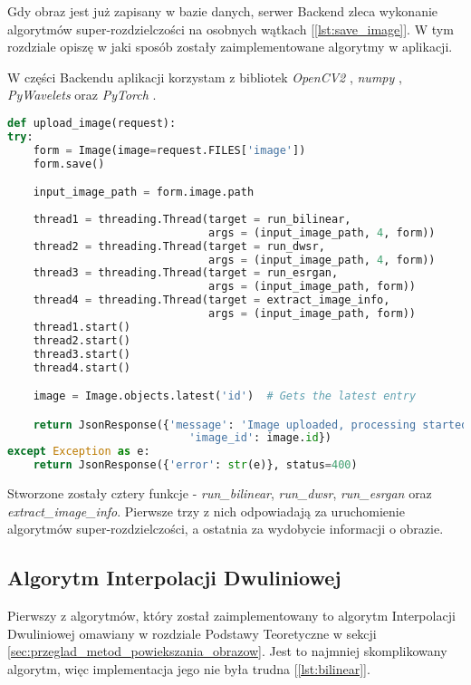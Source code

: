 Gdy obraz jest już zapisany w bazie danych, serwer Backend zleca wykonanie algorytmów super-rozdzielczości na osobnych wątkach [\ref{lst:save_image}]. W tym rozdziale opiszę w jaki sposób zostały zaimplementowane algorytmy w aplikacji.

W części Backendu aplikacji korzystam z bibliotek \textit{OpenCV2} \cite{opencv}, \textit{numpy} \cite{numpy}, \textit{PyWavelets} \cite{pywavelets} oraz \textit{PyTorch} \cite{pytorch}.

\newpage
\begin{lstlisting}[language=Python, caption=Obsługa zapisu i przetwarzania obrazów., label={lst:save_image}]
def upload_image(request):
try:
    form = Image(image=request.FILES['image'])
    form.save()

    input_image_path = form.image.path
    
    thread1 = threading.Thread(target = run_bilinear, 
                               args = (input_image_path, 4, form))
    thread2 = threading.Thread(target = run_dwsr, 
                               args = (input_image_path, 4, form))
    thread3 = threading.Thread(target = run_esrgan, 
                               args = (input_image_path, form))
    thread4 = threading.Thread(target = extract_image_info, 
                               args = (input_image_path, form))
    thread1.start()
    thread2.start()
    thread3.start()
    thread4.start()

    image = Image.objects.latest('id')  # Gets the latest entry

    return JsonResponse({'message': 'Image uploaded, processing started', 
                            'image_id': image.id})
except Exception as e:
    return JsonResponse({'error': str(e)}, status=400)
\end{lstlisting}

Stworzone zostały cztery funkcje - \textit{run\_bilinear}, \textit{run\_dwsr}, \textit{run\_esrgan} oraz\\ \textit{extract\_image\_info}. Pierwsze trzy z nich odpowiadają za uruchomienie algorytmów super-rozdzielczości, a ostatnia za wydobycie informacji o obrazie.




\subsection*{Algorytm Interpolacji Dwuliniowej}

Pierwszy z algorytmów, który został zaimplementowany to algorytm Interpolacji Dwuliniowej omawiany w rozdziale Podstawy Teoretyczne w sekcji \ref{sec:przeglad_metod_powiekszania_obrazow}.
Jest to najmniej skomplikowany algorytm, więc implementacja jego nie była trudna [\ref{lst:bilinear}].

